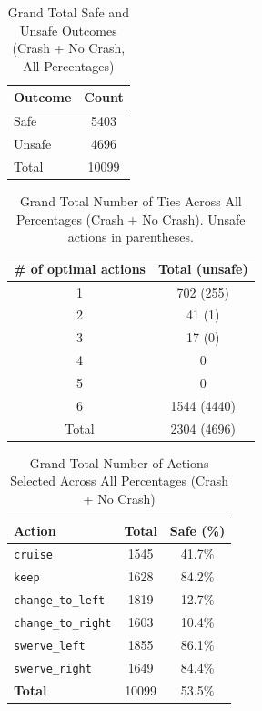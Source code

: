\documentclass{article}
\begin{document}
\begin{table}[h]
\centering
\caption{Grand Total Safe and Unsafe Outcomes (Crash + No Crash, All Percentages)}
\begin{tabular}{lc}
\toprule
Outcome & Count \\
\midrule
Safe & 5403 \\ 
Unsafe & 4696 \\ 
\midrule
Total & 10099 \\ 
\bottomrule
\end{tabular}
\end{table}

\begin{table}[h]
\centering
\caption{Grand Total Number of Ties Across All Percentages (Crash + No Crash).
Unsafe actions in parentheses.}
\begin{tabular}{c|c}
\toprule
\# of optimal actions & Total (unsafe) \\
\midrule
1 & 702 (255) \\ 
2 & 41 (1) \\ 
3 & 17 (0) \\ 
4 & 0 \\ 
5 & 0 \\ 
6 & 1544 (4440) \\ 
\midrule
Total & 2304 (4696) \\ 
\bottomrule
\end{tabular}
\end{table}

\begin{table}[h]
\centering
\caption{Grand Total Number of Actions Selected Across All Percentages (Crash + No Crash)}
\begin{tabular}{l|c|c}
\toprule
Action & Total & Safe (\%) \\
\midrule
\texttt{cruise} & 1545 & 41.7\% \\ 
\texttt{keep} & 1628 & 84.2\% \\ 
\texttt{change\_to\_left} & 1819 & 12.7\% \\ 
\texttt{change\_to\_right} & 1603 & 10.4\% \\ 
\texttt{swerve\_left} & 1855 & 86.1\% \\ 
\texttt{swerve\_right} & 1649 & 84.4\% \\ 
\midrule
\textbf{Total} & 10099 & 53.5\% \\ 
\bottomrule
\end{tabular}
\end{table}
\end{document}
